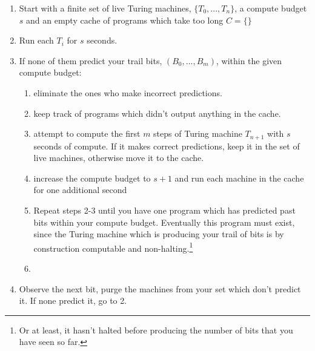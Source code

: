 \documentclass[12pt,authoryear]{elsarticle}
\begin{document}
\begin{enumerate}
	\item Start with a finite set of live Turing machines, $\{T_0, ..., T_n\}$, a compute budget $s$ and an empty cache of programs which take too long $C =\{\}$
	\item Run each $T_i$ for $s$ seconds. 
	\item If none of them predict your trail bits, $(B_0, ..., B_m)$, within the given compute budget: 
		\begin{enumerate}
		   \item eliminate the ones who make incorrect predictions.
			 \item keep track of programs which didn't output anything in the cache.
			 \item attempt to compute the first $m$ steps of Turing machine $T_{n+1}$ with $s$ seconds of compute. If it makes correct predictions, keep it in the set of live machines, otherwise move it to the cache.
			 \item increase the compute budget to $s + 1$ and run each machine in the cache for one additional second
			 \item Repeat steps 2-3 until you have one program which has predicted past bits within your compute budget. Eventually this program must exist, since the Turing machine which is producing your trail of bits is by construction computable and non-halting.\footnote{Or at least, it hasn't halted before producing the number of bits that you have seen so far.}
			\item 
		\end{enumerate}
	\item Observe the next bit, purge the machines from your set which don't predict it. If none predict it, go to 2.
\end{enumerate}
\end{document}
